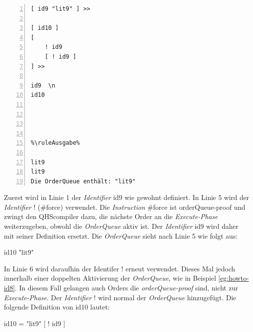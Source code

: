 {
\begin{multicols}{2}
\begin{lstlisting}[language=QHS, label=eg:howto-id9, caption=Beispiel zu {\selectListingFont \#force} , numbers=left, stepnumber=1]
%\ruleEingabe%
[ id9 "lit9" ] >>

[ id10 ]
[
    ! id9
    [ ! id9 ]
] >>

id9  \n
id10




%\ruleAusgabe%

lit9
lit9
Die OrderQueue enthält: "lit9"
\end{lstlisting}
\columnbreak
Zuerst wird in Linie 1 der \textit{Identifier} {\selectListingFont id9} wie gewohnt definiert. In Linie 5 wird der \textit{Identifier} {\selectListingFont !} ({\selectListingFont \#force}) verwendet.
Die \textit{Instruction} {\selectListingFont \#force} ist orderQueue-proof und zwingt den QHScompiler dazu, die nächste Order an die \textit{Execute-Phase} weiterzugeben, obwohl die \textit{OrderQueue} aktiv ist.
Der \textit{Identifier} {\selectListingFont id9} wird daher mit seiner Definition ersetzt. Die \textit{OrderQueue} sieht nach Linie 5 wie folgt aus: \break
\centerline{\selectListingFont id10 "lit9"{}}
In Linie 6 wird daraufhin der Identifer {\selectListingFont !} erneut verwendet. Dieses Mal jedoch innerhalb einer doppelten Aktivierung der \textit{OrderQueue}, wie in Beispiel \ref{eg:howto-id8}.
In diesem Fall gelangen auch Orders die \textit{orderQueue-proof} sind, nicht zur \textit{Execute-Phase}. Der \textit{Identifier} {\selectListingFont !} wird normal der \textit{OrderQueue} hinzugefügt.
Die folgende Definition von {\selectListingFont id10} lautet: \break
\centerline{\selectListingFont id10 = "lit9"{} [ ! id9 ]}
\end{multicols}
}

